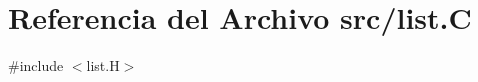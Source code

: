 \hypertarget{list_8_c}{}\section{Referencia del Archivo src/list.C}
\label{list_8_c}
{\ttfamily \#include $<$list.\+H$>$}\newline
